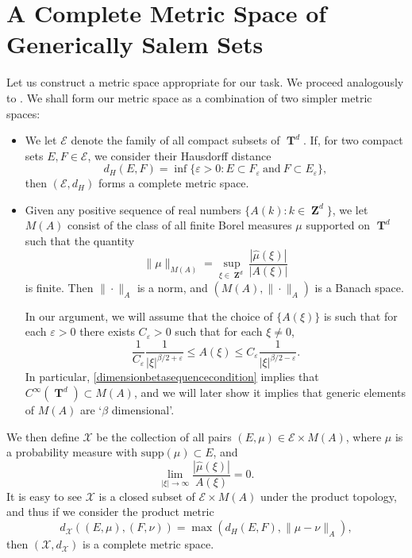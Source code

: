 \documentclass[12pt,reqno]{article}
\numberwithin{equation}{section}
\DeclareMathOperator{\ZZ}{\mathbf{Z}}
\DeclareMathOperator{\TT}{\mathbf{T}}
\begin{document}
\section{A Complete Metric Space of Generically Salem Sets}

Let us construct a metric space appropriate for our task. We proceed analogously to \cite{Korner2}. We shall form our metric space as a combination of two simpler metric spaces:
%
\begin{itemize}
    \item We let $\mathcal{E}$ denote the family of all compact subsets of $\TT^d$. If, for two compact sets $E,F \in \mathcal{E}$, we consider their Hausdorff distance
    \[ d_H(E,F) = \inf \{ \varepsilon > 0 : E \subset F_\varepsilon\ \text{and}\ F \subset E_\varepsilon \}, \]
    then $(\mathcal{E},d_H)$ forms a complete metric space.

    \item Given any positive sequence of real numbers $\{ A(k) : k \in \ZZ^d \}$, we let $M(A)$ consist of the class of all finite Borel measures $\mu$ supported on $\TT^d$ such that the quantity
    \[ \| \mu \|_{M(A)} = \sup_{\xi \in \ZZ^d} \frac{|\widehat{\mu}(\xi)|}{|A(\xi)|} \]
    is finite. Then $\| \cdot \|_A$ is a norm, and $(M(A), \| \cdot \|_A)$ is a Banach space.

    In our argument, we will assume that the choice of $\{ A(\xi) \}$ is such that for each $\varepsilon > 0$ there exists $C_\varepsilon > 0$ such that for each $\xi \neq 0$,
    \begin{equation} \label{dimensionbetasequencecondition}
        \frac{1}{C_\varepsilon} \frac{1}{|\xi|^{\beta/2 + \varepsilon}} \leq A(\xi) \leq C_\varepsilon \frac{1}{|\xi|^{\beta/2 - \varepsilon}}.
    \end{equation}
    In particular, \eqref{dimensionbetasequencecondition} implies that $C^\infty(\TT^d) \subset M(A)$, and we will later show it implies that generic elements of $M(A)$ are `$\beta$ dimensional'.
\end{itemize}
%
We then define $\mathcal{X}$ be the collection of all pairs $(E,\mu) \in \mathcal{E} \times M(A)$, where $\mu$ is a probability measure with $\text{supp}(\mu) \subset E$, and
%
\[ \lim_{|\xi| \to \infty} \frac{|\widehat{\mu}(\xi)|}{A(\xi)} = 0. \]
%
It is easy to see $\mathcal{X}$ is a closed subset of $\mathcal{E} \times M(A)$ under the product topology, and thus if we consider the product metric
%
\[ d_{\mathcal{X}}((E,\mu),(F,\nu)) = \max \left( d_H(E,F), \| \mu - \nu \|_A \right), \]
%
then $(\mathcal{X},d_\mathcal{X})$ is a complete metric space.
\end{document}
